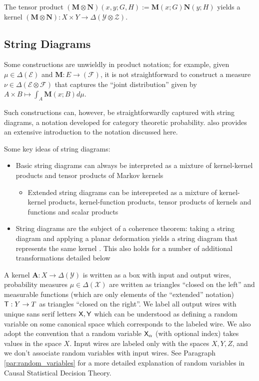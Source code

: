 The tensor product $(\mathbf{M}\otimes \mathbf{N})(x,y;G,H) := \mathbf{M}(x;G)\mathbf{N}(y;H)$ yields a kernel $(\mathbf{M}\otimes \mathbf{N}):X\times Y\to \Delta(\mathcal{Y}\otimes\mathcal{Z})$.

\subsection{String Diagrams}

Some constructions are unwieldly in product notation; for example, given $\mu\in \Delta(\mathcal{E})$ and $\mathbf{M}:E\to (\mathcal{F})$, it is not straightforward to construct a measure $\nu\in\Delta(\mathcal{E}\otimes\mathcal{F})$ that captures the ``joint distribution'' given by $A\times B\mapsto \int_A \mathbf{M}(x;B)d\mu$. 

Such constructions can, however, be straightforwardly captured with string diagrams, a notation developed for category theoretic probability. \citet{cho_disintegration_2019} also provides an extensive introduction to the notation discussed here.

Some key ideas of string diagrams:
\begin{itemize}
	\item Basic string diagrams can always be interpreted as a mixture of kernel-kernel products and tensor products of Markov kernels
	\begin{itemize}
	\item Extended string diagrams can be interepreted as a mixture of kernel-kernel products, kernel-function products, tensor products of kernels and functions and scalar products 
	\end{itemize}
	\item String diagrams are the subject of a coherence theorem: taking a string diagram and applying a planar deformation yields a string diagram that represents the same kernel \citep{selinger_survey_2010}. This also holds for a number of additional transformations detailed below
\end{itemize}

A kernel $\mathbf{A}:X\to \Delta(\mathcal{Y})$ is written as a box with input and output wires, probability measures $\mu\in \Delta(\mathcal{X})$ are written as triangles ``closed on the left'' and measurable functions (which are only elements of the ``extended'' notation) $\mathsf{T}:Y\to T$ as triangles ``closed on the right''. We label all output wires with unique sans serif letters $\mathsf{X},\mathsf{Y}$ which can be understood as defining a random variable on some canonical space which corresponds to the labeled wire. We also adopt the convention that a random variable $\mathsf{X}_\alpha$ (with optional index) takes values in the space $X$. Input wires are labeled only with the spaces $X,Y,Z$, and we don't associate random variables with input wires. See Paragraph \ref{par:random_variables} for a more detailed explanation of random variables in Causal Statistical Decision Theory.


